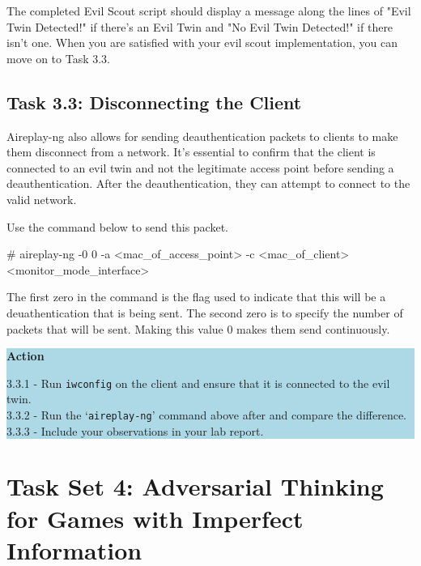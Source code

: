 \documentclass[letterpaper,12pt]{report}
\begin{document}
The completed Evil Scout script should display a message along the lines of "Evil Twin Detected!" if there's an Evil Twin and "No Evil Twin Detected!" if there isn't one. When you are satisfied with your evil scout implementation, you can move on to Task 3.3.

\subsection*{Task 3.3: Disconnecting the Client}\label{sec:Task-3.3-Disconnecting-the-Client}

Aireplay-ng also allows for sending deauthentication packets to clients to make them disconnect from a network. It's essential to confirm that the client is connected to an evil twin and not the legitimate access point before sending a deauthentication. After the deauthentication, they can attempt to connect to the valid network. 

Use the command below to send this packet.

\bigskip

\begin{mdframed}[backgroundcolor=black!10,style=code,nobreak=true,align=center,userdefinedwidth=14cm]
\# aireplay-ng  -0 0 -a <mac\_of\_access\_point> -c <mac\_of\_client> <monitor\_mode\_interface>
\end{mdframed}

\bigskip

The first zero in the command is the flag used to indicate that this will be a deuathentication that is being sent. The second zero is to specify the number of packets that will be sent. Making this value 0 makes them send continuously.

\colorbox{lightblue}{%
\parbox{\dimexpr\linewidth-2\fboxsep}{%
\textbf{Action}

3.3.1 - Run \texttt{iwconfig} on the client and ensure that it is connected to the evil twin.\\
3.3.2 - Run the `\texttt{aireplay-ng}' command  above after and compare the difference.\\
3.3.3 - Include your observations in your lab report.
    }%
}%


\section*{Task Set 4: Adversarial Thinking for Games with Imperfect Information}\label{sec:Task 4: Game Theory}
\end{document}
